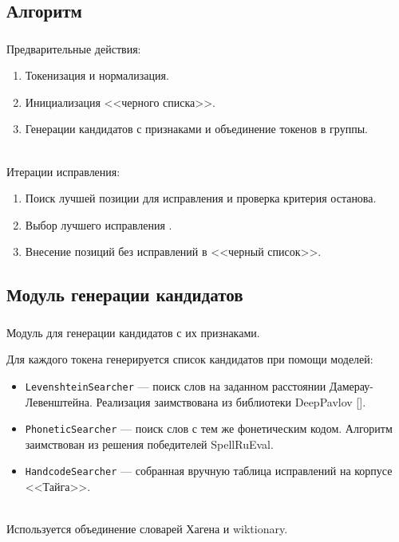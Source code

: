 \documentclass[t, aspectratio=169]{beamer}  %
\begin{document}
\subsection{Алгоритм}
\begin{frame}
	\frametitle{\insertsection} 
	\framesubtitle{\insertsubsection}
	
	Предварительные действия:
	\begin{enumerate}
		\item Токенизация и нормализация. 
		\item Инициализация <<черного списка>>.
		\item Генерации кандидатов с признаками и объединение токенов в группы. \\~\\
	\end{enumerate} 
	
	Итерации исправления:
	\begin{enumerate}
		\item Поиск лучшей позиции для исправления и проверка критерия останова.
		\item Выбор лучшего исправления .
		\item Внесение позиций без исправлений в <<черный список>>.
	\end{enumerate}
\end{frame}

\subsection{Модуль генерации кандидатов}
\begin{frame}
	\frametitle{\insertsection} 
	\framesubtitle{\insertsubsection}
	Модуль для генерации кандидатов с их признаками. 
	
	Для каждого токена генерируется список кандидатов при помощи моделей:
	\begin{itemize}
		\item \texttt{LevenshteinSearcher}  --- поиск слов на заданном расстоянии Дамерау-Левенштейна. Реализация заимствована из библиотеки DeepPavlov [\textcite{Burtsev2015}].
		\item \texttt{PhoneticSearcher} --- поиск слов с тем же фонетическим кодом. Алгоритм заимствован из решения победителей SpellRuEval.
		\item \texttt{HandcodeSearcher} --- собранная вручную таблица исправлений на корпусе <<Тайга>>. \\~\\
	\end{itemize}
	
	Используется объединение словарей Хагена и wiktionary.  \\~\\
\end{frame}
\end{document}
